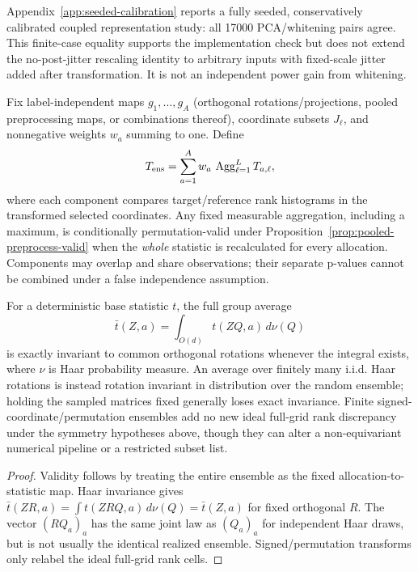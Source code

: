 {Appendix~\ref{app:seeded-calibration} reports a fully seeded, conservatively calibrated coupled representation study: all 17000 PCA/whitening pairs agree. This finite-case equality supports the implementation check but does not extend the no-post-jitter rescaling identity to arbitrary inputs with fixed-scale jitter added after transformation. It is not an independent power gain from whitening.

\begin{proposition}\label{prop:representation-ensemble}
Fix label-independent maps $g_1,\ldots,g_A$ (orthogonal rotations/projections, pooled preprocessing maps, or combinations thereof), coordinate subsets $J_\ell$, and nonnegative weights $w_a$ summing to one. Define
\[
T_{\rm ens}=\sum_{a=1}^A w_a\,\operatorname{Agg}_{\ell=1}^L
T_{a,\ell},
\]
where each component compares target/reference rank histograms in the transformed selected coordinates. Any fixed measurable aggregation, including a maximum, is conditionally permutation-valid under Proposition~\ref{prop:pooled-preprocess-valid} when the \emph{whole} statistic is recalculated for every allocation. Components may overlap and share observations; their separate p-values cannot be combined under a false independence assumption.

For a deterministic base statistic $t$, the full group average
\[
\bar t(Z,a)=\int_{O(d)}t(ZQ,a)\,d\nu(Q)
\]
is exactly invariant to common orthogonal rotations whenever the integral exists, where $\nu$ is Haar probability measure. An average over finitely many i.i.d. Haar rotations is instead rotation invariant in distribution over the random ensemble; holding the sampled matrices fixed generally loses exact invariance. Finite signed-coordinate/permutation ensembles add no new ideal full-grid rank discrepancy under the symmetry hypotheses above, though they can alter a non-equivariant numerical pipeline or a restricted subset list.
\end{proposition}
\begin{proof}
Validity follows by treating the entire ensemble as the fixed allocation-to-statistic map. Haar invariance gives $\bar t(ZR,a)=\int t(ZRQ,a)\,d\nu(Q)=\bar t(Z,a)$ for fixed orthogonal $R$. The vector $(RQ_a)_a$ has the same joint law as $(Q_a)_a$ for independent Haar draws, but is not usually the identical realized ensemble. Signed/permutation transforms only relabel the ideal full-grid rank cells.
\end{proof}

}
